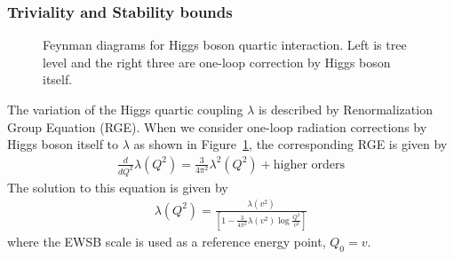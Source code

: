 \subsubsection{Triviality and Stability bounds}
\begin{figure}[t]
\centering
{}
\hspace{0.3cm}
 \hspace{0.3cm}
\hspace{0.3cm}
\caption{Feynman diagrams for Higgs boson quartic interaction. Left is tree level and 
the right three are one-loop correction by Higgs boson itself.} 
\label{fig:FD_triviality} 
\end{figure} 
The variation of the Higgs quartic coupling $\lambda$ is described by 
Renormalization Group Equation (RGE). 
When we consider one-loop radiation corrections by Higgs boson itself 
to $\lambda$ as shown in Figure~\ref{fig:FD_triviality}, 
the corresponding RGE is given by \cite{Djouadi20081} 
\begin{eqnarray} 
\frac{d}{dQ^2} \lambda (Q^2) 
= 
\frac{3}{4\pi^2} \lambda^2(Q^2) + \textrm{higher orders} 
\end{eqnarray} 
The solution to this equation is given by 
\begin{eqnarray} 
\displaystyle  \lambda(Q^2) = \frac{\lambda(v^2)} {\left[\displaystyle   1 - \frac{3}{4\pi^2} \lambda(v^2) \log{\frac{Q^2}{v^2}}\right] } 
\end{eqnarray} 
where the EWSB scale is used as a reference energy point, $Q_0 = v$. 

